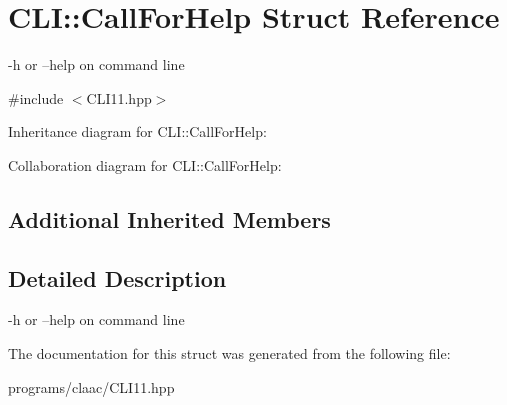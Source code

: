 \hypertarget{struct_c_l_i_1_1_call_for_help}{}\section{C\+LI\+:\+:Call\+For\+Help Struct Reference}
\label{struct_c_l_i_1_1_call_for_help}


-\/h or --help on command line  




{\ttfamily \#include $<$C\+L\+I11.\+hpp$>$}



Inheritance diagram for C\+LI\+:\+:Call\+For\+Help\+:


Collaboration diagram for C\+LI\+:\+:Call\+For\+Help\+:
\subsection*{Additional Inherited Members}


\subsection{Detailed Description}
-\/h or --help on command line 

The documentation for this struct was generated from the following file\+:\begin{DoxyCompactItemize}
\item 
programs/claac/C\+L\+I11.\+hpp\end{DoxyCompactItemize}
